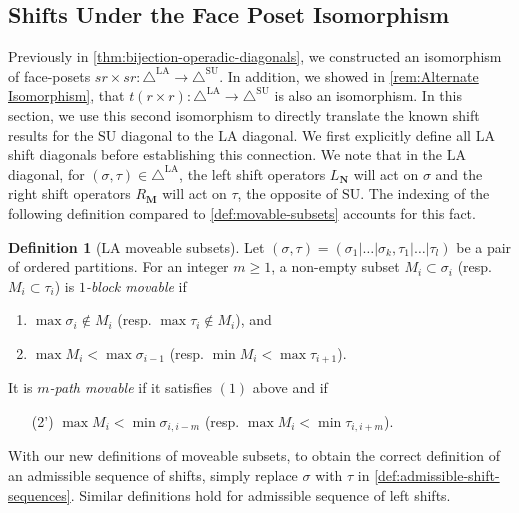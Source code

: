 \documentclass{amsart}
\theoremstyle{definition}
\newtheorem{definition}[theorem]{Definition}
\newcommand{\SU}{\mathrm{SU}}
\newcommand{\LA}{\mathrm{LA}}
\newcommand{\SUD}{\triangle^{\mathrm{SU}}}
\newcommand{\LAD}{\triangle^{\mathrm{LA}}}
\begin{document}
\subsection{Shifts Under the Face Poset Isomorphism}

Previously in \cref{thm:bijection-operadic-diagonals}, we constructed an isomorphism of face-posets $sr\times sr:\LAD\to\SUD$.
In addition, we showed in \cref{rem:Alternate Isomorphism}, that $t(r\times r):\LAD\to\SUD$ is also an isomorphism.
In this section, we use this second isomorphism to directly translate the known shift results for the $\SU$ diagonal to the $\LA$ diagonal. 
We first explicitly define all $\LA$ shift diagonals before establishing this connection.
We note that in the $\LA$ diagonal, for $(\sigma,\tau)\in \LAD$, the left shift operators $L_\mathbf{N}$ will act on $\sigma$ and the right shift operators $R_\mathbf{M}$ will act on $\tau$, the opposite of $\SU$.
The indexing of the following definition compared to \cref{def:movable-subsets} accounts for this fact.

\begin{definition}[$\LA$ moveable subsets]
\label{def:LAD movable-subsets}
Let $(\sigma,\tau) = (\sigma_1|\dots|\sigma_k,\tau_1|\dots|\tau_l)$ be a pair of ordered partitions.
For an integer $m\geq 1$, a non-empty subset $M_i \subset \sigma_i$ (resp. $M_{i}\subset \tau_{i}$) is \emph{$1$-block movable} if 
\begin{enumerate}
    \item $\max \sigma_i \notin M_i$ (resp. $\max \tau_{i} \notin M_i$), and
    \item $\max M_i < \max \sigma_{i-1}$ (resp. $\min M_{i} < \max \tau_{i+1}$).
\end{enumerate}
It is \emph{$m$-path movable} if it satisfies $(1)$ above and if
\begin{enumerate}
    \item[(2')] $\max M_i < \min \sigma_{i,i-m}$ (resp. $\max M_{i} < \min \tau_{i,i+m}$).
\end{enumerate}
\end{definition}
With our new definitions of moveable subsets, to obtain the correct definition of an admissible sequence of shifts, simply replace $\sigma$ with $\tau$ in \cref{def:admissible-shift-sequences}. 
Similar definitions hold for admissible sequence of left shifts.
\end{document}
